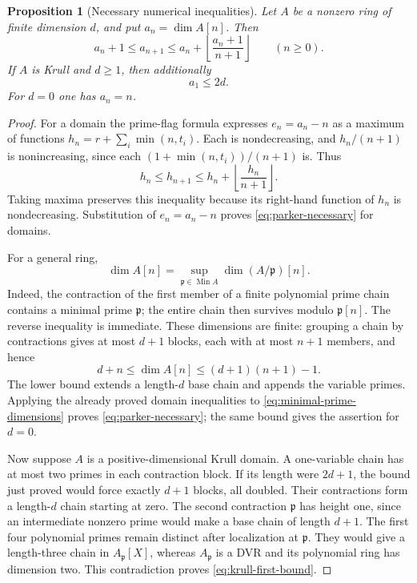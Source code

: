 \documentclass[11pt,reqno]{amsart}
\numberwithin{equation}{section}
\theoremstyle{plain}
\newtheorem{proposition}[theorem]{Proposition}
\theoremstyle{definition}
\theoremstyle{remark}
\begin{document}
\begin{proposition}[Necessary numerical inequalities]\label{prop:necessary}
Let \(A\) be a nonzero ring of finite dimension \(d\), and put
\(a_n=\dim A[n]\). Then
\begin{equation}\label{eq:parker-necessary}
 a_n+1\leq a_{n+1}\leq
 a_n+\left\lfloor\frac{a_n+1}{n+1}\right\rfloor
 \qquad(n\geq0).
\end{equation}
If \(A\) is Krull and \(d\geq1\), then additionally
\begin{equation}\label{eq:krull-first-bound}
 a_1\leq2d.
\end{equation}
For \(d=0\) one has \(a_n=n\).
\end{proposition}

\begin{proof}
For a domain the prime-flag formula expresses \(e_n=a_n-n\) as a
maximum of functions \(h_n=r+\sum_i\min(n,t_i)\). Each is
nondecreasing, and \(h_n/(n+1)\) is nonincreasing, since each
\((1+\min(n,t_i))/(n+1)\) is. Thus
\[
 h_n\leq h_{n+1}\leq h_n+\left\lfloor\frac{h_n}{n+1}\right\rfloor.
\]
Taking maxima preserves this inequality because its right-hand function
of \(h_n\) is nondecreasing. Substitution of \(e_n=a_n-n\) proves
\eqref{eq:parker-necessary} for domains.

For a general ring,
\begin{equation}\label{eq:minimal-prime-dimensions}
 \dim A[n]=\sup_{\mathfrak p\in\operatorname{Min}A}
                    \dim(A/\mathfrak p)[n].
\end{equation}
Indeed, the contraction of the first member of a finite polynomial
prime chain contains a minimal prime \(\mathfrak p\); the entire
chain then survives modulo \(\mathfrak p[n]\). The reverse inequality
is immediate. These dimensions are finite: grouping a chain by
contractions gives at most \(d+1\) blocks, each with at most \(n+1\)
members, and hence
\begin{equation}\label{eq:seidenberg-many}
 d+n\leq\dim A[n]\leq(d+1)(n+1)-1.
\end{equation}
The lower bound extends a length-\(d\) base chain and appends the
variable primes. Applying the already proved domain inequalities to
\eqref{eq:minimal-prime-dimensions} proves
\eqref{eq:parker-necessary}; the same bound gives the assertion for
\(d=0\).

Now suppose \(A\) is a positive-dimensional Krull domain. A
one-variable chain has at most two primes in each contraction block.
If its length were \(2d+1\), the bound just proved would force exactly
\(d+1\) blocks, all doubled. Their contractions form a length-\(d\)
chain starting at zero. The second contraction \(\mathfrak p\) has
height one, since an intermediate nonzero prime would make a base
chain of length \(d+1\). The first four polynomial primes remain
distinct after localization at \(\mathfrak p\). They would give
a length-three chain in \(A_{\mathfrak p}[X]\), whereas
\(A_{\mathfrak p}\) is a DVR and its polynomial ring has dimension
two. This contradiction proves \eqref{eq:krull-first-bound}.
\end{proof}
\end{document}
